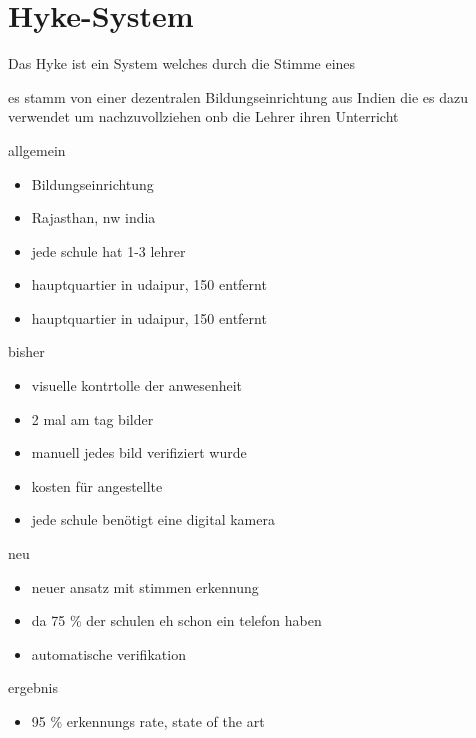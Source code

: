 \section{Hyke-System}
\label{hyke}

Das Hyke ist ein System welches durch die Stimme eines 

es stamm von einer dezentralen Bildungseinrichtung aus Indien die es dazu verwendet um nachzuvollziehen onb die Lehrer ihren Unterricht 




allgemein
\begin{itemize}
	\item Bildungseinrichtung
	\item Rajasthan, nw india
	\item jede schule hat 1-3 lehrer
	\item hauptquartier in udaipur, 150 entfernt
	\item hauptquartier in udaipur, 150 entfernt
\end{itemize}


bisher
\begin{itemize}
	\item visuelle kontrtolle der anwesenheit
	\item 2 mal am tag bilder
	\item manuell jedes bild verifiziert wurde
	\item kosten für angestellte
	\item jede schule benötigt eine digital kamera
\end{itemize}

neu
\begin{itemize}
	\item neuer ansatz mit stimmen erkennung
	\item da 75 \% der schulen eh schon ein telefon haben
	\item automatische verifikation
\end{itemize}


ergebnis
\begin{itemize}
	\item 95 \% erkennungs rate, state of the art
\end{itemize}